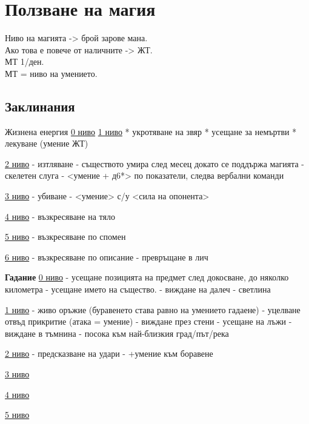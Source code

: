 \section{Ползване на магия}
Ниво на магията -> брой зарове мана.  \\
Ако това е повече от наличните -> ЖТ. \\
МТ 1/ден.                             \\
МТ = ниво на умението.                \\



\subsection{Заклинания} 



Жизнена енергия 
\underline{0 ниво} 
\underline{1 ниво}
* укротяване на звяр
* усещане за немъртви
* лекуване (умение ЖТ)

\underline{2 ниво}
- изтляване - съществото умира след месец  докато се поддържа магията
- скелетен слуга - <умение + д6*> по показатели, следва вербални команди

\underline{3 ниво}
- убиване - <умение> с/у <сила на опонента>

\underline{4 ниво}
- възкресяване на тяло

\underline{5 ниво}
- възкресяване по спомен

\underline{6 ниво}
- възкресяване по описание
- превръщане в лич

\textbf{Гадание}
\underline{0 ниво}
- усещане позицията на предмет след докосване, до няколко километра
- усещане името на същество.
- виждане на далеч
- светлина

\underline{1 ниво}
- живо оръжие (буравенето става равно на умението гадаене)
- уцелване отвъд прикритие (атака = умение)
- виждане през стени
- усещане на лъжи
- виждане в тъмнина
- посока към най-близкия град/път/река

\underline{2 ниво}
- предсказване на удари - +умение към боравене

\underline{3 ниво}

\underline{4 ниво}

\underline{5 ниво}


